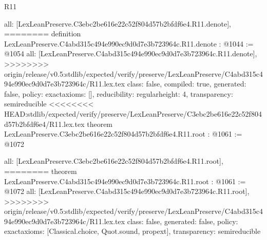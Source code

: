 \begin{lexlean}{R11}
\begin{coremodule}
{{{{{{{{{{{{  all: [LexLeanPreserve.C3ebc2be616e22c52f804d57b2bfdf6e4.R11.denote],
========
definition LexLeanPreserve.C4abd315c494e990ec9d0d7e3b723964c.R11.denote : @1044 := @1054 {
  all: [LexLeanPreserve.C4abd315c494e990ec9d0d7e3b723964c.R11.denote],
>>>>>>>> origin/release/v0.5:stdlib/expected/verify/preserve/LexLeanPreserve/C4abd315c494e990ec9d0d7e3b723964c/R11.lex.tex
  class: false,
  compiled: true,
  generated: false,
  policy: exact{axioms: []},
  reducibility: regular{height: 4},
  transparency: semireducible
}
<<<<<<<< HEAD:stdlib/expected/verify/preserve/LexLeanPreserve/C3ebc2be616e22c52f804d57b2bfdf6e4/R11.lex.tex
theorem LexLeanPreserve.C3ebc2be616e22c52f804d57b2bfdf6e4.R11.root : @1061 := @1072 {
  all: [LexLeanPreserve.C3ebc2be616e22c52f804d57b2bfdf6e4.R11.root],
========
theorem LexLeanPreserve.C4abd315c494e990ec9d0d7e3b723964c.R11.root : @1061 := @1072 {
  all: [LexLeanPreserve.C4abd315c494e990ec9d0d7e3b723964c.R11.root],
>>>>>>>> origin/release/v0.5:stdlib/expected/verify/preserve/LexLeanPreserve/C4abd315c494e990ec9d0d7e3b723964c/R11.lex.tex
  class: false,
  generated: false,
  policy: exact{axioms: [Classical.choice, Quot.sound, propext]},
  transparency: semireducible
}

}}}}}}}}}}}}}
\end{coremodule}
\end{lexlean}
